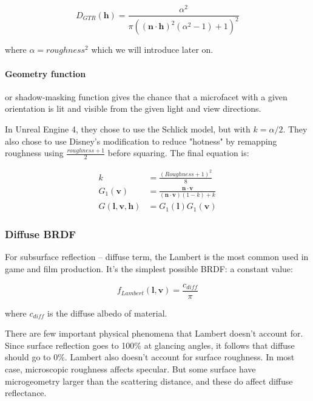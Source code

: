 \begin{equation}
	D_{GTR}(\mathbf{h})=\frac{\alpha^{2}}{\pi((\mathbf{n}\cdot\mathbf{h})^2 (\alpha^2-1)+1)^2}
\end{equation}

where $\alpha=roughness^2$ which we will introduce later on.

\paragraph{\textbf{Geometry function}} or shadow-masking function gives the chance that a microfacet with a given orientation is lit and visible from the given light and view directions.

In Unreal Engine 4\cite{a:RealShadinginUnrealEngine4}, they chose to use the Schlick model, but with $k=\alpha /2$. They also chose to use Disney's modification to reduce "hotness" by remapping roughness using $\frac{roughness+1}{2}$ before squaring. The final equation is:

\begin{equation}
	\begin{aligned}
		k&=\frac{(Roughness+1)^2}{8}\\
		G_1(\mathbf{v})&=\frac{\mathbf{n}\cdot\mathbf{v}}{(\mathbf{n}\cdot\mathbf{v})(1-k)+k}\\
		G(\mathbf{l},\mathbf{v},\mathbf{h})&=G_1(\mathbf{l})G_1(\mathbf{v})
	\end{aligned}
\end{equation}


\subsubsection{Diffuse BRDF}
For subsurface reflection -- diffuse term, the Lambert is the most common used in game and film production. It's the simplest possible BRDF: a constant value:

\begin{equation}
	f_{Lambert}(\mathbf{l},\mathbf{v})=\frac{c_{diff}}{\pi}
\end{equation}

where $c_{diff}$ is the diffuse albedo of material.

There are few important physical phenomena that Lambert doesn't account for. Since surface reflection goes to 100\% at glancing angles, it follows that diffuse should go to 0\%. Lambert also doesn't account for surface roughness. In most case, microscopic roughness affects specular. But some surface have microgeometry larger than the scattering distance, and these do affect diffuse reflectance.

